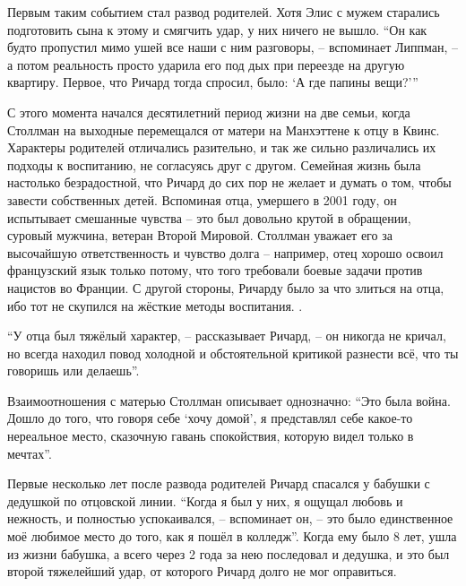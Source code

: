 Первым таким событием стал развод родителей. Хотя Элис с мужем старались подготовить сына к этому и смягчить удар, у них ничего не вышло. \enquote{Он как будто пропустил мимо ушей все наши с ним разговоры, -- вспоминает Липпман, -- а потом реальность просто ударила его под дых при переезде на другую квартиру. Первое, что Ричард тогда спросил, было: \enquote{А где папины вещи?}\hspace{0.01in}}

С этого момента начался десятилетний период жизни на две семьи, когда Столлман на выходные перемещался от матери на Манхэттене к отцу в Квинс. Характеры родителей отличались разительно, и так же сильно различались их подходы к воспитанию, не согласуясь друг с другом. Семейная жизнь была настолько безрадостной, что Ричард до сих пор не желает и думать о том, чтобы завести собственных детей. Вспоминая отца, умершего в 2001 году, он испытывает смешанные чувства -- это был довольно крутой в обращении, суровый мужчина, ветеран Второй Мировой. Столлман уважает его за высочайшую ответственность и чувство долга -- например, отец хорошо освоил французский язык только потому, что того требовали боевые задачи против нацистов во Франции. С другой стороны, Ричарду было за что злиться на отца, ибо тот не скупился на жёсткие методы воспитания. .

\enquote{У отца был тяжёлый характер, -- рассказывает Ричард, -- он никогда не кричал, но всегда находил повод холодной и обстоятельной критикой разнести всё, что ты говоришь или делаешь}.

Взаимоотношения с матерью Столлман описывает однозначно: \enquote{Это была война. Дошло до того, что говоря себе \enquote{хочу домой}, я представлял себе какое-то нереальное место, сказочную гавань спокойствия, которую видел только в мечтах}.

Первые несколько лет после развода родителей Ричард спасался у бабушки с дедушкой по отцовской линии. \enquote{Когда я был у них, я ощущал любовь и нежность, и полностью успокаивался, -- вспоминает он, -- это было единственное моё любимое место до того, как я пошёл в колледж}. Когда ему было 8 лет, ушла из жизни бабушка, а всего через 2 года за нею последовал и дедушка, и это был второй тяжелейший удар, от которого Ричард долго не мог оправиться.

